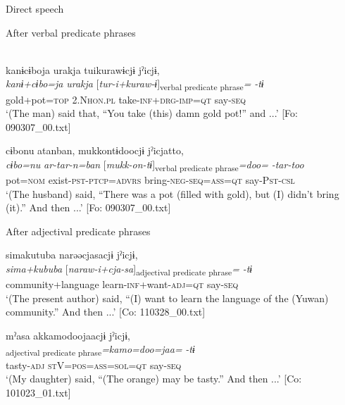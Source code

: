 \ea\label{ex:10.62}   Direct speech\\
  \begin{xlist}
  \exi{} After verbal predicate phrases

  \ex\relax [= (8-148 g)]\\
      \glll    kanɨcɨboja  urakja  tuikurawɨcjɨ  jˀicjɨ,\\
      \textit{kanɨ+cɨbo=ja}  \textit{urakja}  [\textit{tur-i+kuraw-ɨ}]\textsubscript{verbal predicate phrase}\textit{=}  \textit{-tɨ}\\
      gold+pot=\textsc{top}  2.N\textsc{hon}.\textsc{pl}  take-\textsc{inf}+\textsc{drg}-\textsc{imp}=\textsc{qt}  say-\textsc{seq}\\
      \glt       ‘(The man) said that, “You take (this) damn gold pot!” and ...’ [Fo: 090307\_00.txt]

  \ex %
      \glll    cɨbonu  atanban,  mukkontɨdoocjɨ     jˀicjatto,\\
      \textit{cɨbo=nu}  \textit{ar-tar-n=ban}  [\textit{mukk-on-tɨ}]\textsubscript{verbal predicate phrase}\textit{=doo=}   \textit{-tar-too}\\
      pot=\textsc{nom}  exist-\textsc{pst}-\textsc{ptcp}=\textsc{advrs}  bring-\textsc{neg}-\textsc{seq}=\textsc{ass}=\textsc{qt}   say-P\textsc{st}-\textsc{csl}\\
      \glt       ‘(The husband) said, “There was a pot (filled with gold), but (I) didn’t bring (it).” And then ...’ [Fo: 090307\_00.txt]

  \exi{} After adjectival predicate phrases

  \ex  %
      \glll    simakutuba  narəəcjasacjɨ  jˀicjɨ,\\
      \textit{sima+kububa}  [\textit{naraw-i+cja-sa}]\textsubscript{adjectival predicate phrase}\textit{=}  \textit{-tɨ}\\
      community+language  learn-\textsc{inf}+want-\textsc{adj}=\textsc{qt}  say-\textsc{seq}\\
      \glt       ‘(The present author) said, “(I) want to learn the language of the (Yuwan) community.” And then ...’ [Co: 110328\_00.txt]

  \ex  %
      \glll    mˀasa  akkamodoojaacjɨ  jˀicjɨ,\\
      [\textit{mˀa-sa}  \textit{ar}]\textsubscript{adjectival predicate phrase}\textit{=kamo=doo=jaa=}  \textit{-tɨ}\\
      tasty-\textsc{adj}  \textsc{st}V=\textsc{pos}=\textsc{ass}=\textsc{sol}=\textsc{qt}  say-\textsc{seq}\\
      \glt       ‘(My daughter) said, “(The orange) may be tasty.” And then ...’ [Co: 101023\_01.txt]


\end{xlist}
